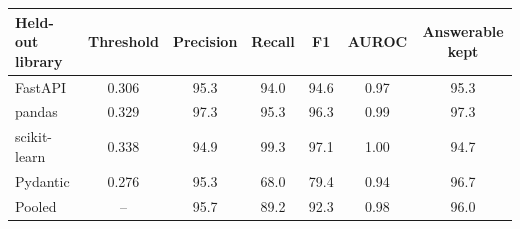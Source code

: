 \begin{tabular}{lcccccc}
\toprule
Held-out library & Threshold & Precision & Recall & F1 & AUROC & Answerable kept \\
\midrule
FastAPI & 0.306 & 95.3 & 94.0 & 94.6 & 0.97 & 95.3 \\
pandas & 0.329 & 97.3 & 95.3 & 96.3 & 0.99 & 97.3 \\
scikit-learn & 0.338 & 94.9 & 99.3 & 97.1 & 1.00 & 94.7 \\
Pydantic & 0.276 & 95.3 & 68.0 & 79.4 & 0.94 & 96.7 \\
\midrule
Pooled & -- & 95.7 & 89.2 & 92.3 & 0.98 & 96.0 \\
\bottomrule
\end{tabular}
